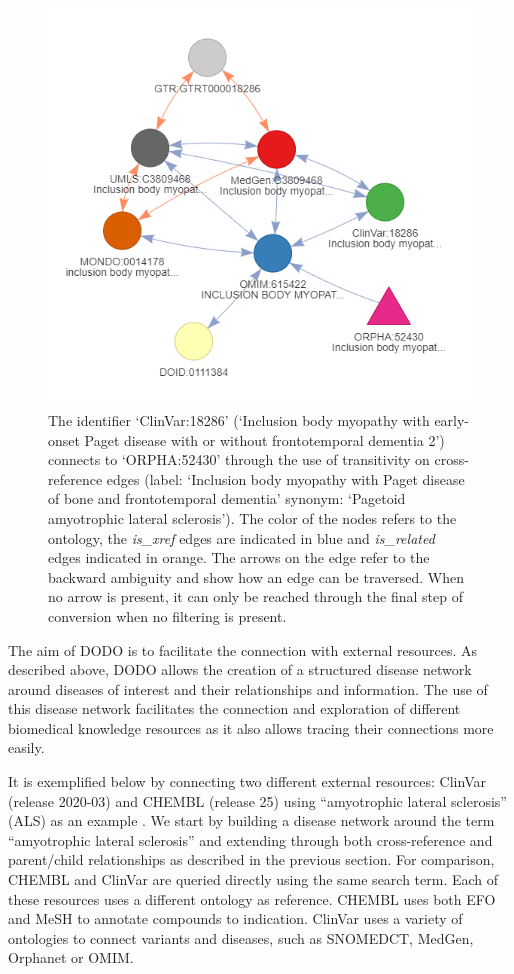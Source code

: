 \documentclass[9pt,a4paper,]{extarticle}
\begin{document}
\begin{figure}

{\centering \includegraphics[width=0.7\linewidth]{DODO-F1000-publication_files/figure-latex/Figure13} 

}

\caption{The identifier `ClinVar:18286' (`Inclusion body myopathy with early-onset Paget disease with or without frontotemporal dementia 2') connects to `ORPHA:52430' through the use of transitivity on cross-reference edges (label: `Inclusion body myopathy with Paget disease of bone and frontotemporal dementia' synonym: `Pagetoid amyotrophic lateral sclerosis'). The color of the nodes refers to the ontology, the \emph{is\_xref} edges are indicated in blue and \emph{is\_related} edges indicated in orange. The arrows on the edge refer to the backward ambiguity and show how an edge can be traversed. When no arrow is present, it can only be reached through the final step of conversion when no filtering is present.}\label{fig:disnetALSclinvar}
\end{figure}

The aim of DODO is to facilitate the connection with external resources. As described above, DODO allows the creation of a structured disease network around diseases of interest and their relationships and information. The use of this disease network facilitates the connection and exploration of different biomedical knowledge resources as it also allows tracing their connections more easily.

It is exemplified below by connecting two different external resources: ClinVar (release 2020-03) and CHEMBL (release 25) using ``amyotrophic lateral sclerosis'' (ALS) as an example \citep{Landrum2018, Mendez2019}. We start by building a disease network around the term ``amyotrophic lateral sclerosis'' and extending through both cross-reference and parent/child relationships as described in the previous section.
For comparison, CHEMBL and ClinVar are queried directly using the same search term. Each of these resources uses a different ontology as reference. CHEMBL uses both EFO and MeSH to annotate compounds to indication. ClinVar uses a variety of ontologies to connect variants and diseases, such as SNOMEDCT, MedGen, Orphanet or OMIM.
\end{document}
